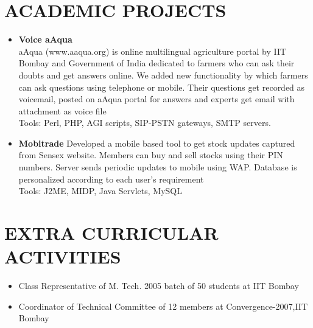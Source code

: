 \documentclass{res}
\begin{document}
\begin{resume}
\begin{itemize}
					  \end{itemize}


					  \section{ACADEMIC PROJECTS}

					  \begin{itemize}
					  \item {\bf Voice aAqua}\\
						aAqua (www.aaqua.org) is online multilingual agriculture portal by IIT Bombay and Government of India dedicated to farmers who can ask their doubts and get answers online. We added new functionality by which farmers can ask questions using telephone or mobile. Their questions get recorded as voicemail, posted on aAqua portal for answers and experts get email with attachment as voice file\\
	Tools: Perl, PHP, AGI scripts, SIP-PSTN gateways, SMTP servers.
					  
					  \item {\bf Mobitrade}
					  Developed a mobile based tool to get stock updates captured from Sensex website. Members can buy and sell stocks using their PIN numbers. Server sends periodic updates to mobile using WAP. Database is personalized according to each user’s requirement\\
					  Tools: J2ME, MIDP, Java Servlets, MySQL
					  \end{itemize}
\section{EXTRA CURRICULAR ACTIVITIES}
\begin{itemize}
\item Class Representative of M. Tech. 2005 batch of 50 students at IIT Bombay
\item Coordinator of Technical Committee of 12 members at Convergence-2007,IIT Bombay
\end{itemize}

					  \end{resume} 
					  
\end{document}

